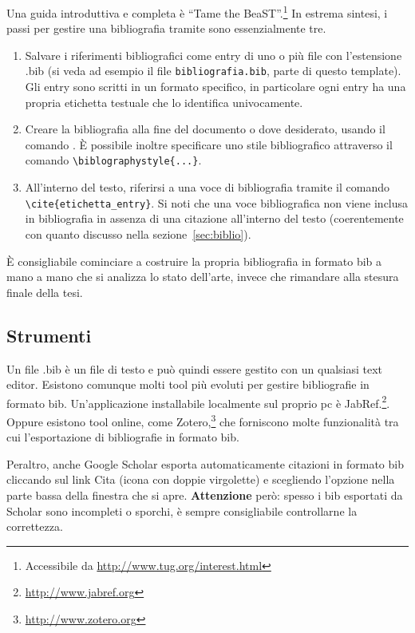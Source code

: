 \documentclass[12pt]{report}
\begin{document}
Una guida introduttiva e completa \`e ``Tame the BeaST''.\footnote{Accessibile da \url{http://www.tug.org/interest.html}}
In estrema sintesi, i passi per gestire una bibliografia tramite  sono essenzialmente tre.
\begin{enumerate}
\item Salvare i riferimenti bibliografici come entry di uno o pi\`u file con l'estensione .bib (si veda ad esempio il file \texttt{bibliografia.bib}, parte di questo template). Gli entry sono scritti in un formato specifico, in particolare ogni entry ha una propria etichetta testuale che lo identifica univocamente.
\item Creare la bibliografia alla fine del documento o dove desiderato, usando il comando \verb||. \`E possibile inoltre specificare uno stile bibliografico attraverso il comando \verb|\biblographystyle{...}|.
\item All'interno del testo, riferirsi a una voce di bibliografia tramite il comando\\ \verb|\cite{etichetta_entry}|. Si noti che una voce bibliografica non viene inclusa in bibliografia in assenza di una citazione all'interno del testo (coerentemente con quanto discusso nella sezione~\ref{sec:biblio}).
\end{enumerate}

\`E consigliabile cominciare a costruire la propria bibliografia in formato bib a mano a mano che si analizza lo stato dell'arte, invece che rimandare alla stesura finale della tesi.

\subsection{Strumenti}

Un file .bib \`e un file di testo e pu\`o quindi essere gestito con un qualsiasi text editor. Esistono comunque molti tool pi\`u evoluti per gestire bibliografie in formato bib. Un'applicazione installabile localmente sul proprio pc \`e JabRef.\footnote{\url{http://www.jabref.org}}. Oppure esistono tool online, come Zotero,\footnote{\url{http://www.zotero.org}} che forniscono molte funzionalità tra cui l'esportazione di bibliografie in formato bib.

Peraltro, anche Google Scholar esporta automaticamente citazioni in formato bib cliccando sul link Cita (icona con doppie virgolette) e scegliendo l'opzione  nella parte bassa della finestra che si apre. \textbf{Attenzione} per\`o: spesso i bib esportati da Scholar sono incompleti o sporchi, \`e sempre consigliabile controllarne la correttezza.
\end{document}
